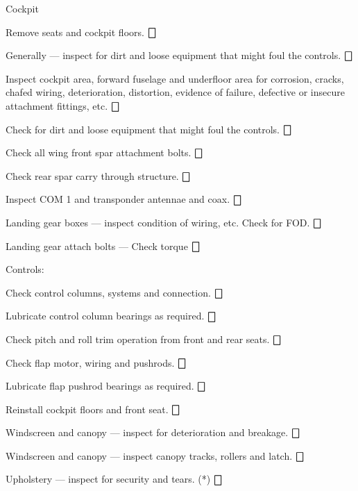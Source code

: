 \begin{enumerate*}
	\item{Cockpit} 
	\begin{enumerate*}
		\item Remove seats and cockpit floors. \dotfill $\bigbox$
		\item Generally --- inspect for dirt and loose equipment that might foul the controls. \dotfill $\bigbox$
		\item Inspect cockpit area, forward fuselage and underfloor area for corrosion, cracks, chafed wiring, deterioration, distortion, evidence of failure, defective or insecure attachment fittings, etc. \dotfill $\bigbox$
		\item Check for dirt and loose equipment that might foul the controls. \dotfill $\bigbox$
		\item Check all wing front spar attachment bolts. \dotfill $\bigbox$
		\item Check rear spar carry through structure. \dotfill $\bigbox$
		\item Inspect COM 1 and transponder antennae and coax. \dotfill $\bigbox$
		\item Landing gear boxes --- inspect condition of wiring, etc. Check for FOD. \dotfill $\bigbox$
		\item Landing gear attach bolts --- Check torque \dotfill $\bigbox$
		\item Controls:
  	\begin{enumerate*}
  		\item Check control columns, systems and connection. \dotfill $\bigbox$
  		\item Lubricate control column bearings as required. \dotfill $\bigbox$
  		\item Check pitch and roll trim operation from front and rear seats. \dotfill $\bigbox$
  		\item Check flap motor, wiring and pushrods. \dotfill $\bigbox$
  		\item Lubricate flap pushrod bearings as required. \dotfill $\bigbox$
  	  \end{enumerate*}
		\item Reinstall cockpit floors and front seat. \dotfill $\bigbox$
		\item Windscreen and canopy --- inspect for deterioration and breakage. \dotfill $\bigbox$
		\item Windscreen and canopy --- inspect canopy tracks, rollers and latch. \dotfill $\bigbox$
		\item Upholstery --- inspect for security and tears. (*) \dotfill $\bigbox$

\end{enumerate*}
\end{enumerate*}
